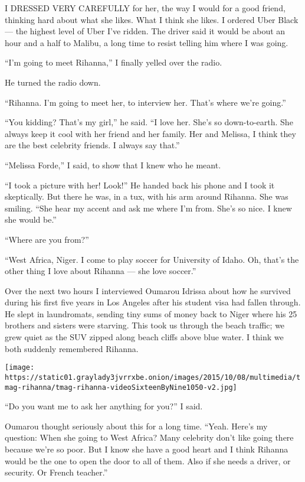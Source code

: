 I DRESSED VERY CAREFULLY for her, the way I would for a good friend,
thinking hard about what she likes. What I think she likes. I ordered
Uber Black --- the highest level of Uber I've ridden. The driver said it
would be about an hour and a half to Malibu, a long time to resist
telling him where I was going.

``I'm going to meet Rihanna,'' I finally yelled over the radio.

He turned the radio down.

``Rihanna. I'm going to meet her, to interview her. That's where we're
going.''

``You kidding? That's my girl,'' he said. ``I love her. She's so
down-to-earth. She always keep it cool with her friend and her family.
Her and Melissa, I think they are the best celebrity friends. I always
say that.''

``Melissa Forde,'' I said, to show that I knew who he meant.

``I took a picture with her! Look!'' He handed back his phone and I took
it skeptically. But there he was, in a tux, with his arm around Rihanna.
She was smiling. ``She hear my accent and ask me where I'm from. She's
so nice. I knew she would be.''

``Where are you from?''

``West Africa, Niger. I come to play soccer for University of Idaho. Oh,
that's the other thing I love about Rihanna --- she love soccer.''

Over the next two hours I interviewed Oumarou Idrissa about how he
survived during his first five years in Los Angeles after his student
visa had fallen through. He slept in laundromats, sending tiny sums of
money back to Niger where his 25 brothers and sisters were starving.
This took us through the beach traffic; we grew quiet as the SUV zipped
along beach cliffs above blue water. I think we both suddenly remembered
Rihanna.

\texttt{[image: https://static01.graylady3jvrrxbe.onion/images/2015/10/08/multimedia/tmag-rihanna/tmag-rihanna-videoSixteenByNine1050-v2.jpg]}

``Do you want me to ask her anything for you?'' I said.

Oumarou thought seriously about this for a long time. ``Yeah. Here's my
question: When she going to West Africa? Many celebrity don't like going
there because we're so poor. But I know she have a good heart and I
think Rihanna would be the one to open the door to all of them. Also if
she needs a driver, or security. Or French teacher.''

